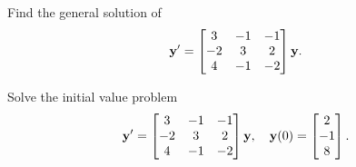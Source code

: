 \begin{example}\label{example:10.4.2}
\begin{alist}
\item %
 Find the general solution of
\begin{equation}\label{eq:10.4.12}
\mathbf{y}'=\begin{bmatrix}3&-1&-1\\-2&3&2\\4&-1&-2\end{bmatrix}\mathbf{y}.
\end{equation}

\item  %
 Solve the initial value problem
\begin{equation}\label{eq:10.4.13}
\mathbf{y}'=\begin{bmatrix}3&-1&-1\\-2&3&2\\4&-1&-2\end{bmatrix}\mathbf{y},\quad
\mathbf{y}(0)=\begin{bmatrix}2\\-1\\8\end{bmatrix}.
\end{equation}
\end{alist}
\end{example}

